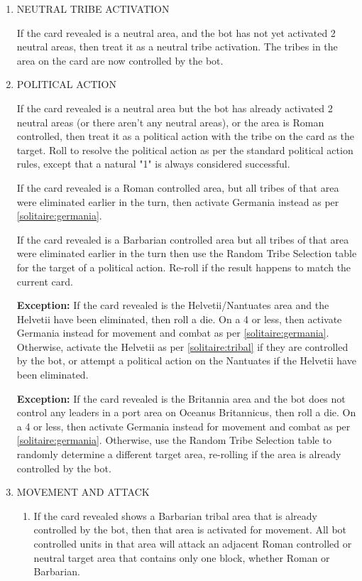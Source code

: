 \renewcommand{\labelenumii}{\alph{enumii}.}
\begin{enumerate}
  \item NEUTRAL TRIBE ACTIVATION

  If the card revealed is a neutral area, and the bot has not yet activated 2 neutral areas, then treat it as a neutral tribe activation. The tribes in the area on the card are now controlled by the bot.

  \item POLITICAL ACTION
  
  If the card revealed is a neutral area but the bot has already activated 2 neutral areas (or there aren't any neutral areas), or the area is Roman controlled, then treat it as a political action with the tribe on the card as the target. Roll to resolve the political action as per the standard political action rules, except that a natural "1" is always considered successful.
  
  If the card revealed is a Roman controlled area, but all tribes of that area were eliminated earlier in the turn, then activate Germania instead as per \ref{solitaire:germania}.
  
  If the card revealed is a Barbarian controlled area but all tribes of that area were eliminated earlier in the turn then use the Random Tribe Selection table for the target of a political action. Re-roll if the result happens to match the current card.
  
  \textbf{Exception:} If the card revealed is the Helvetii/Nantuates area and the Helvetii have been eliminated, then roll a die. On a 4 or less, then activate Germania instead for movement and combat as per \ref{solitaire:germania}. Otherwise, activate the Helvetii as per \ref{solitaire:tribal} if they are controlled by the bot, or attempt a political action on the Nantuates if the Helvetii have been eliminated.
  
  \textbf{Exception:} If the card revealed is the Britannia area and the bot does not control any leaders in a port area on Oceanus Britannicus, then roll a die. On a 4 or less, then activate Germania instead for movement and combat as per \ref{solitaire:germania}. Otherwise, use the Random Tribe Selection table to randomly determine a different target area, re-rolling if the area is already controlled by the bot.

  \item MOVEMENT AND ATTACK

  \begin{enumerate}[leftmargin=0in]
    \item \label{solitaire:tribal} If the card revealed shows a Barbarian tribal area that is already controlled by the bot, then that area is activated for movement. All bot controlled units in that area will attack an adjacent Roman controlled or neutral target area that contains only one block, whether Roman or Barbarian.
    

\end{enumerate}
\end{enumerate}
